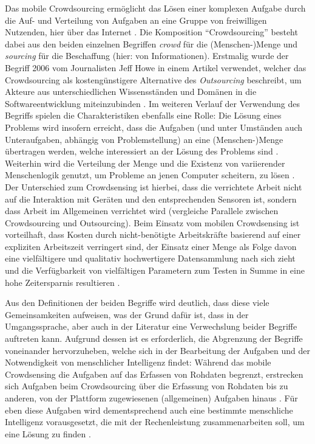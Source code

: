 Das mobile Crowdsourcing ermöglicht das Lösen einer komplexen Aufgabe durch die Auf- und Verteilung von Aufgaben an eine Gruppe von freiwilligen Nutzenden, hier über das Internet \cite{Wang2019}. Die Komposition \enquote{Crowdsourcing} besteht dabei 
aus den beiden einzelnen Begriffen \textit{crowd} für die (Menschen-)Menge und \textit{sourcing} für die Beschaffung (hier: von Informationen). Erstmalig wurde der Begriff 2006 vom Journalisten Jeff Howe in einem Artikel verwendet, welcher das Crowdsourcing 
als kostengünstigere Alternative des \textit{Outsourcing} 
beschreibt, um Akteure aus unterschiedlichen Wissensständen und Domänen in die Softwareentwicklung miteinzubinden \cite{Howe2006}. Im weiteren Verlauf der Verwendung des Begriffs spielen die Charakteristiken ebenfalls eine Rolle: Die Lösung eines Problems wird 
insofern erreicht, dass die Aufgaben (und unter Umständen auch Unteraufgaben, abhängig von Problemstellung) an eine (Menschen-)Menge übertragen werden, welche interessiert an der Lösung des Problems sind \cite{Ray2022}. Weiterhin wird die Verteilung der Menge 
und die Existenz von variierender Menschenlogik genutzt, um Probleme an jenen Computer scheitern, zu lösen \cite{Ray2022}. Der Unterschied zum Crowdsensing ist hierbei, dass die verrichtete Arbeit nicht auf die Interaktion mit Geräten und den entsprechenden Sensoren 
ist, sondern dass Arbeit im Allgemeinen verrichtet wird (vergleiche Parallele zwischen Crowdsourcing und Outsourcing). Beim Einsatz vom mobilen Crowdsensing ist vorteilhaft, dass Kosten durch nicht-benötigte Arbeitskräfte basierend auf einer expliziten Arbeitszeit 
verringert sind, der Einsatz einer Menge als Folge davon eine vielfältigere und qualitativ hochwertigere Datensammlung nach sich zieht und die Verfügbarkeit von vielfältigen Parametern zum Testen in Summe in eine hohe Zeitersparnis resultieren \cite{Ray2022}.

Aus den Definitionen der beiden Begriffe wird deutlich, dass diese viele Gemeinsamkeiten aufweisen, was der Grund dafür ist, dass in der Umgangssprache, aber auch in der Literatur eine Verwechslung beider Begriffe auftreten kann. Aufgrund dessen ist es erforderlich, die 
Abgrenzung der Begriffe voneinander hervorzuheben, welche sich in der Bearbeitung der Aufgaben und der Notwendigkeit von menschlicher Intelligenz findet: Während das mobile Crowdsensing die Aufgaben auf das Erfassen von Rohdaten begrenzt, erstrecken sich Aufgaben beim 
Crowdsourcing über die Erfassung von Rohdaten bis zu anderen, von der Plattform zugewiesenen (allgemeinen) Aufgaben hinaus \cite{Ray2022}. Für eben diese Aufgaben wird dementsprechend auch eine bestimmte menschliche Intelligenz vorausgesetzt, die mit der Rechenleistung 
zusammenarbeiten soll, um eine Lösung zu finden \cite{Ray2022}.

